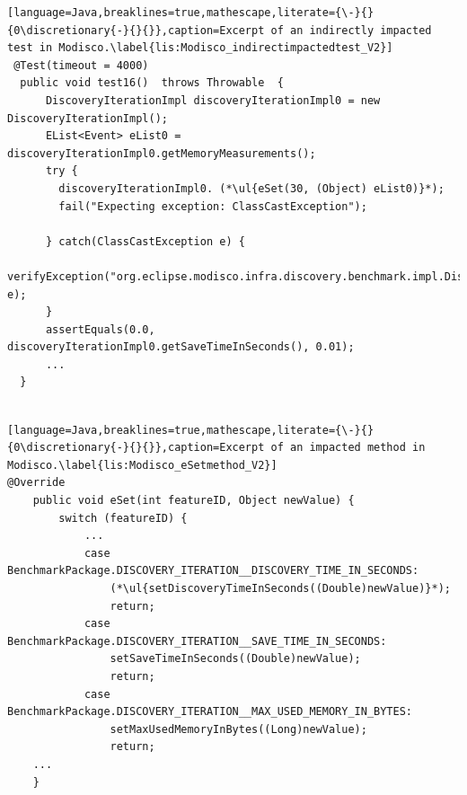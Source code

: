 \begin{lstlisting}[language=Java,breaklines=true,mathescape,literate={\-}{}{0\discretionary{-}{}{}},caption=Excerpt of an indirectly impacted test in Modisco.\label{lis:Modisco_indirectimpactedtest_V2}]
 @Test(timeout = 4000)
  public void test16()  throws Throwable  {
      DiscoveryIterationImpl discoveryIterationImpl0 = new DiscoveryIterationImpl();
      EList<Event> eList0 = discoveryIterationImpl0.getMemoryMeasurements();
      try { 
        discoveryIterationImpl0. (*\ul{eSet(30, (Object) eList0)}*);
        fail("Expecting exception: ClassCastException");
      
      } catch(ClassCastException e) {
        verifyException("org.eclipse.modisco.infra.discovery.benchmark.impl.DiscoveryIterationImpl", e);
      }
      assertEquals(0.0, discoveryIterationImpl0.getSaveTimeInSeconds(), 0.01);
      ...
  }
    
\end{lstlisting}



\begin{lstlisting}[language=Java,breaklines=true,mathescape,literate={\-}{}{0\discretionary{-}{}{}},caption=Excerpt of an impacted method in Modisco.\label{lis:Modisco_eSetmethod_V2}]
@Override
	public void eSet(int featureID, Object newValue) {
		switch (featureID) {
			...
			case BenchmarkPackage.DISCOVERY_ITERATION__DISCOVERY_TIME_IN_SECONDS:
				(*\ul{setDiscoveryTimeInSeconds((Double)newValue)}*);
				return;
			case BenchmarkPackage.DISCOVERY_ITERATION__SAVE_TIME_IN_SECONDS:
				setSaveTimeInSeconds((Double)newValue);
				return;
			case BenchmarkPackage.DISCOVERY_ITERATION__MAX_USED_MEMORY_IN_BYTES:
				setMaxUsedMemoryInBytes((Long)newValue);
				return;
    ...
    }
    
    
\end{lstlisting}


